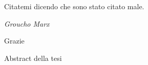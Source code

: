 \documentclass[corpo=11pt,numerazioneromana]{toptesi}
\makeatletter
\newcommand\listofcodes{%
 \iffrontmatter\else\frontmattertrue\fi
 \if@openright\cleardoublepage\else\clearpage\fi
 \begingroup\def\chapter##1{\@schapter}
 \phantomsection %
 \addcontentsline{toc}{chapter}{Elenco dei listati}
 \lstlistoflistings
 \endgroup
}
\makeatother
\begin{document}
\begin{flushright}
  \noindent
  Citatemi dicendo che sono stato citato male.

  \textit{Groucho Marx}
\end{flushright}
\cleardoublepage


\ringraziamenti
Grazie


\sommario
Abstract della tesi


\tableofcontents

\listoffigures




\mainmatter




\appendix



{}
\nocite{*}
\printbibliography
\end{document}
